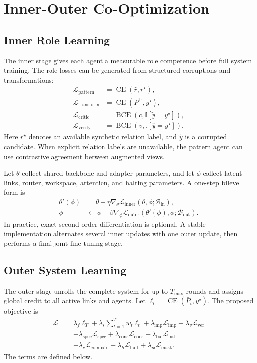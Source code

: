 \documentclass[10pt,a4paper,twocolumn]{article}
\newcommand{\CE}{\operatorname{CE}}
\newcommand{\BCE}{\operatorname{BCE}}
\newcommand{\Ind}{\mathbb{I}}
\begin{document}
\section{Inner-Outer Co-Optimization}
\subsection{Inner Role Learning}
The inner stage gives each agent a measurable role competence before full system training. The role losses can be generated from structured corruptions and transformations:
\begin{align}
\mathcal{L}_{\mathrm{pattern}} &= \CE(\hat r,r^\star),\\
\mathcal{L}_{\mathrm{transform}} &= \CE(P^{\mathrm{tr}},y^\star),\\
\mathcal{L}_{\mathrm{critic}} &= \BCE(c,\Ind[\tilde y=y^\star]),\\
\mathcal{L}_{\mathrm{verify}} &= \BCE(v,\Ind[\hat y=y^\star]). \label{eq:role_losses}
\end{align}
Here $r^\star$ denotes an available synthetic relation label, and $\tilde y$ is a corrupted candidate. When explicit relation labels are unavailable, the pattern agent can use contrastive agreement between augmented views.

Let $\theta$ collect shared backbone and adapter parameters, and let $\phi$ collect latent links, router, workspace, attention, and halting parameters. A one-step bilevel form is
\begin{align}
\theta'(\phi) &= \theta-\eta\nabla_\theta\mathcal{L}_{\mathrm{inner}}(\theta,\phi;\mathcal{B}_{\mathrm{in}}), \label{eq:inner_update}\\
\phi &\leftarrow \phi-\beta\nabla_\phi\mathcal{L}_{\mathrm{outer}}(\theta'(\phi),\phi;\mathcal{B}_{\mathrm{out}}). \label{eq:outer_update}
\end{align}
In practice, exact second-order differentiation is optional. A stable implementation alternates several inner updates with one outer update, then performs a final joint fine-tuning stage.

\subsection{Outer System Learning}
The outer stage unrolls the complete system for up to $T_{\max}$ rounds and assigns global credit to all active links and agents. Let $\ell_t=\CE(\bar P_t,y^\star)$. The proposed objective is
\begin{align}
\mathcal{L} ={}& \lambda_f\ell_T
+\lambda_s\sum_{t=1}^{T}w_t\ell_t
+\lambda_{\mathrm{imp}}\mathcal{L}_{\mathrm{imp}}
+\lambda_v\mathcal{L}_{\mathrm{ver}} \nonumber\\
&+\lambda_{\mathrm{spec}}\mathcal{L}_{\mathrm{spec}}
+\lambda_{\mathrm{cons}}\mathcal{L}_{\mathrm{cons}}
+\lambda_{\mathrm{bal}}\mathcal{L}_{\mathrm{bal}} \nonumber\\
&+\lambda_c\mathcal{L}_{\mathrm{compute}}
+\lambda_h\mathcal{L}_{\mathrm{halt}}
+\lambda_m\mathcal{L}_{\mathrm{mask}}. \label{eq:full_loss}
\end{align}
The terms are defined below.
\end{document}
